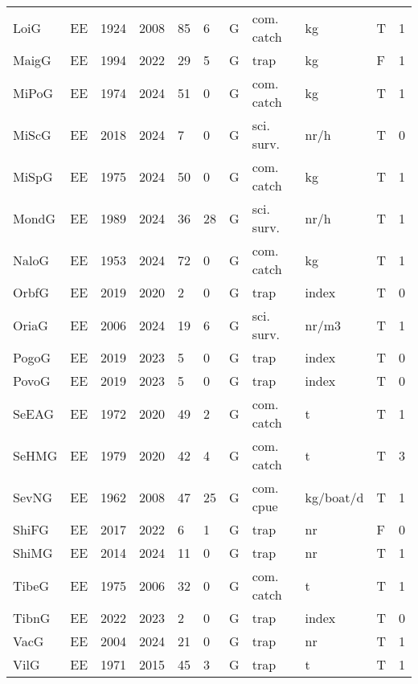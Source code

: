 \begin{table}[ht]
\begin{tabular}{p{1cm}p{1cm}p{1cm}p{1cm}p{0.8cm}p{0.8cm}p{1cm}p{2cm}p{2cm}p{1cm}p{1cm}}
  LoiG & EE & 1924 & 2008 & 85 & 6 & G & com. catch & kg & T & 1 \\ 
  MaigG & EE & 1994 & 2022 & 29 & 5 & G & trap & kg & F & 1 \\ 
  MiPoG & EE & 1974 & 2024 & 51 & 0 & G & com. catch & kg & T & 1 \\ 
  MiScG & EE & 2018 & 2024 & 7 & 0 & G & sci. surv. & nr/h & T & 0 \\ 
  MiSpG & EE & 1975 & 2024 & 50 & 0 & G & com. catch & kg & T & 1 \\ 
  MondG & EE & 1989 & 2024 & 36 & 28 & G & sci. surv. & nr/h & T & 1 \\ 
  NaloG & EE & 1953 & 2024 & 72 & 0 & G & com. catch & kg & T & 1 \\ 
  OrbfG & EE & 2019 & 2020 & 2 & 0 & G & trap & index & T & 0 \\ 
  OriaG & EE & 2006 & 2024 & 19 & 6 & G & sci. surv. & nr/m3 & T & 1 \\ 
  PogoG & EE & 2019 & 2023 & 5 & 0 & G & trap & index & T & 0 \\ 
  PovoG & EE & 2019 & 2023 & 5 & 0 & G & trap & index & T & 0 \\ 
  SeEAG & EE & 1972 & 2020 & 49 & 2 & G & com. catch & t & T & 1 \\ 
  SeHMG & EE & 1979 & 2020 & 42 & 4 & G & com. catch & t & T & 3 \\ 
  SevNG & EE & 1962 & 2008 & 47 & 25 & G & com. cpue & kg/boat/d & T & 1 \\ 
  ShiFG & EE & 2017 & 2022 & 6 & 1 & G & trap & nr & F & 0 \\ 
  ShiMG & EE & 2014 & 2024 & 11 & 0 & G & trap & nr & T & 1 \\ 
  TibeG & EE & 1975 & 2006 & 32 & 0 & G & com. catch & t & T & 1 \\ 
  TibnG & EE & 2022 & 2023 & 2 & 0 & G & trap & index & T & 0 \\ 
  VacG & EE & 2004 & 2024 & 21 & 0 & G & trap & nr & T & 1 \\ 
  VilG & EE & 1971 & 2015 & 45 & 3 & G & trap & t & T & 1 \\ 
   \hline
\end{tabular}
\end{table}
